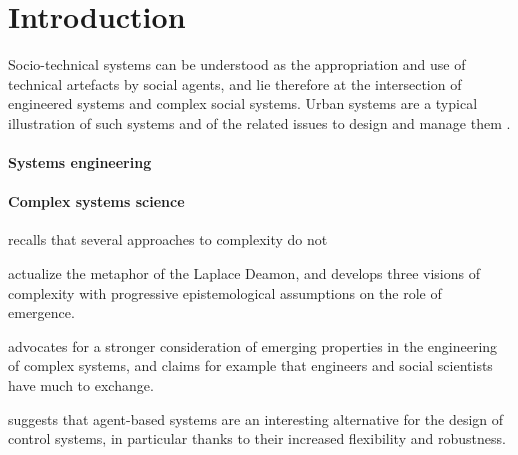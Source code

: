 \documentclass[runningheads,a4paper]{llncs2e/llncs}
\begin{document}
\section{Introduction}



Socio-technical systems can be understood as the appropriation and use of technical artefacts by social agents, and lie therefore at the intersection of engineered systems and complex social systems. Urban systems are a typical illustration of such systems and of the related issues to design and manage them \cite{portugali2012complexity}. 



\paragraph{Systems engineering}


\cite{maier1998architecting}

\cite{estefan2007survey}

\cite{schneider2013literature}

\cite{schafer2017challenges}


\paragraph{Complex systems science}

\cite{chu2008criteria} recalls that several approaches to complexity do not

\cite{deffuant2015visions} actualize the metaphor of the Laplace Deamon, and develops three visions of complexity with progressive epistemological assumptions on the role of emergence.


\cite{ottino2004engineering} advocates for a stronger consideration of emerging properties in the engineering of complex systems, and claims for example that engineers and social scientists have much to exchange.


\cite{jennings2003agent} suggests that agent-based systems are an interesting alternative for the design of control systems, in particular thanks to their increased flexibility and robustness.
\end{document}
